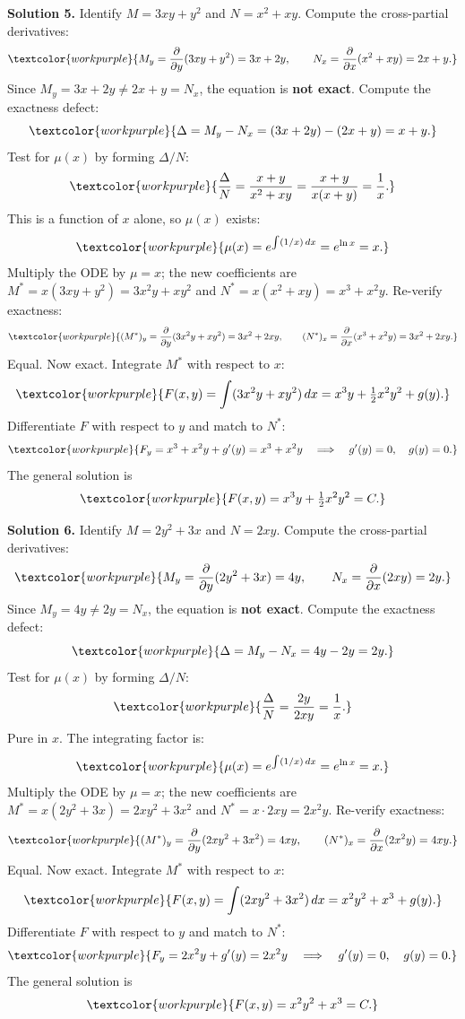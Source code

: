 \noindent\textbf{Solution 5.}\quad
Identify $M = 3xy + y^2$ and $N = x^2 + xy$.
Compute the cross-partial derivatives:
\[
  \textcolor{workpurple}{M_y
  = \frac{\partial}{\partial y}(3xy + y^2)
  = 3x + 2y,
  \qquad
  N_x
  = \frac{\partial}{\partial x}(x^2 + xy)
  = 2x + y.}
\]
Since $M_y = 3x + 2y \neq 2x + y = N_x$, the equation is \textbf{not exact}.
Compute the exactness defect:
\[
  \textcolor{workpurple}{\Delta = M_y - N_x = (3x + 2y) - (2x + y) = x + y.}
\]
Test for $\mu(x)$ by forming $\Delta/N$:
\[
  \textcolor{workpurple}{\frac{\Delta}{N}
  = \frac{x + y}{x^2 + xy}
  = \frac{x + y}{x(x + y)}
  = \frac{1}{x}.}
\]
This is a function of $x$ alone, so $\mu(x)$ exists:
\[
  \textcolor{workpurple}{\mu(x)
  = e^{\int (1/x)\,dx}
  = e^{\ln x}
  = x.}
\]
Multiply the ODE by $\mu = x$; the new coefficients are
$M^* = x(3xy + y^2) = 3x^2 y + xy^2$ and
$N^* = x(x^2 + xy) = x^3 + x^2 y$.
Re-verify exactness:
\[
  \textcolor{workpurple}{(M^*)_y
  = \frac{\partial}{\partial y}(3x^2 y + xy^2)
  = 3x^2 + 2xy,
  \qquad
  (N^*)_x
  = \frac{\partial}{\partial x}(x^3 + x^2 y)
  = 3x^2 + 2xy.}
\]
Equal. Now exact. Integrate $M^*$ with respect to $x$:
\[
  \textcolor{workpurple}{F(x,y)
  = \int(3x^2 y + xy^2)\,dx
  = x^3 y + \tfrac{1}{2}x^2 y^2 + g(y).}
\]
Differentiate $F$ with respect to $y$ and match to $N^*$:
\[
  \textcolor{workpurple}{F_y = x^3 + x^2 y + g'(y) = x^3 + x^2 y
  \quad\Longrightarrow\quad g'(y) = 0,\quad g(y) = 0.}
\]
The general solution is
\[
  \textcolor{workpurple}{F(x,y) = x^3 y + \tfrac{1}{2}x^2 y^2 = C.}
\]

\medskip

\noindent\textbf{Solution 6.}\quad
Identify $M = 2y^2 + 3x$ and $N = 2xy$.
Compute the cross-partial derivatives:
\[
  \textcolor{workpurple}{M_y
  = \frac{\partial}{\partial y}(2y^2 + 3x)
  = 4y,
  \qquad
  N_x
  = \frac{\partial}{\partial x}(2xy)
  = 2y.}
\]
Since $M_y = 4y \neq 2y = N_x$, the equation is \textbf{not exact}.
Compute the exactness defect:
\[
  \textcolor{workpurple}{\Delta = M_y - N_x = 4y - 2y = 2y.}
\]
Test for $\mu(x)$ by forming $\Delta/N$:
\[
  \textcolor{workpurple}{\frac{\Delta}{N}
  = \frac{2y}{2xy}
  = \frac{1}{x}.}
\]
Pure in $x$. The integrating factor is:
\[
  \textcolor{workpurple}{\mu(x)
  = e^{\int (1/x)\,dx}
  = e^{\ln x}
  = x.}
\]
Multiply the ODE by $\mu = x$; the new coefficients are
$M^* = x(2y^2 + 3x) = 2xy^2 + 3x^2$ and $N^* = x\cdot 2xy = 2x^2 y$.
Re-verify exactness:
\[
  \textcolor{workpurple}{(M^*)_y
  = \frac{\partial}{\partial y}(2xy^2 + 3x^2)
  = 4xy,
  \qquad
  (N^*)_x
  = \frac{\partial}{\partial x}(2x^2 y)
  = 4xy.}
\]
Equal. Now exact. Integrate $M^*$ with respect to $x$:
\[
  \textcolor{workpurple}{F(x,y)
  = \int(2xy^2 + 3x^2)\,dx
  = x^2 y^2 + x^3 + g(y).}
\]
Differentiate $F$ with respect to $y$ and match to $N^*$:
\[
  \textcolor{workpurple}{F_y = 2x^2 y + g'(y) = 2x^2 y
  \quad\Longrightarrow\quad g'(y) = 0,\quad g(y) = 0.}
\]
The general solution is
\[
  \textcolor{workpurple}{F(x,y) = x^2 y^2 + x^3 = C.}
\]

